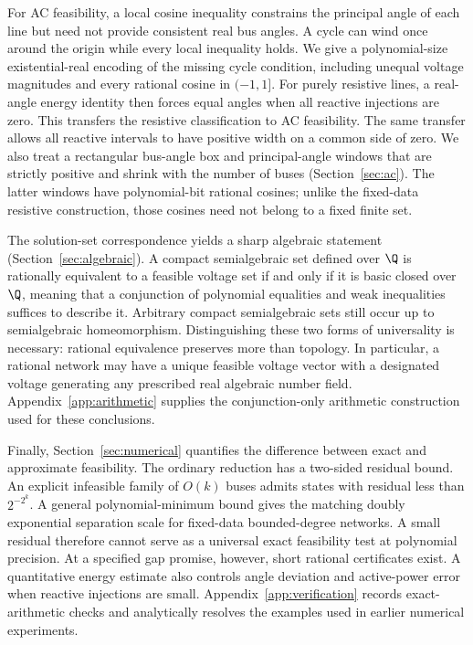 For AC feasibility, a local cosine inequality constrains the principal angle
of each line but need not provide consistent real bus angles. A cycle can
wind once around the origin while every local inequality holds. We give a
polynomial-size existential-real encoding of the missing cycle condition,
including unequal voltage magnitudes and every rational cosine in $(-1,1]$.
For purely resistive lines, a real-angle energy identity then forces equal
angles when all reactive injections are zero. This transfers the resistive
classification to AC feasibility. The same transfer allows all reactive
intervals to have positive width on a common side of zero. We also treat a
rectangular bus-angle box and principal-angle windows that are strictly
positive and shrink with the number of buses
(Section~\ref{sec:ac}). The latter windows have polynomial-bit rational
cosines; unlike the fixed-data resistive construction, those cosines need
not belong to a fixed finite set.

The solution-set correspondence yields a sharp algebraic statement
(Section~\ref{sec:algebraic}). A compact semialgebraic set defined over
$\Q$ is rationally equivalent to a feasible voltage set if and only if
it is basic closed over $\Q$, meaning that a conjunction of polynomial
equalities and weak inequalities suffices to describe it. Arbitrary compact
semialgebraic sets still occur up to semialgebraic homeomorphism. Distinguishing
these two forms of universality is necessary: rational equivalence preserves
more than topology. In particular, a rational network may have a unique
feasible voltage vector with a designated voltage generating any prescribed
real algebraic number field. Appendix~\ref{app:arithmetic} supplies the
conjunction-only arithmetic construction used for these conclusions.

Finally, Section~\ref{sec:numerical} quantifies the difference between exact
and approximate feasibility. The ordinary reduction has a two-sided residual
bound. An explicit infeasible family of $O(k)$ buses admits states with
residual less than $2^{-2^k}$. A general polynomial-minimum bound gives the
matching doubly exponential separation scale for fixed-data bounded-degree
networks. A small residual therefore cannot serve as a universal exact
feasibility test at polynomial precision. At a specified gap promise,
however, short rational certificates exist. A quantitative energy estimate
also controls angle deviation and active-power error when reactive injections
are small. Appendix~\ref{app:verification} records exact-arithmetic checks
and analytically resolves the examples used in earlier numerical experiments.

